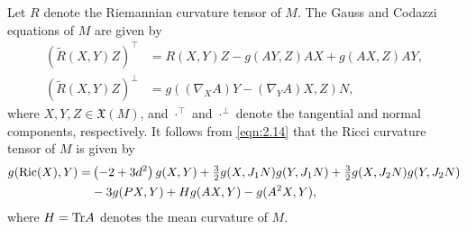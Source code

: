 \documentclass[reqno]{amsart}%
\theoremstyle{definition}
\numberwithin{equation}{section}
\begin{document}
	Let $R$ denote the Riemannian curvature tensor of $M$. The Gauss and Codazzi equations
	of $M$ are given by
	\begin{align}
		(\tilde R(X,Y)Z)^\top &=  R(X,Y)Z - g(AY,Z)AX + g(AX,Z)AY, \label{eqn:2.14} \\
		(\tilde R(X,Y)Z)^\perp &= g((\nabla_X A)Y - (\nabla_Y A)X,Z) N, \label{eqn:2.15}
	\end{align}
	where $X,Y,Z\in \mathfrak X(M)$, and $\cdot^\top$ and $\cdot^\perp$ denote the tangential and normal components, respectively. 
	It follows from \eqref{eqn:2.14} that the Ricci curvature tensor of $M$ is given by
	\begin{equation}\label{eqn:MRic}
		\begin{aligned}
			g({\rm Ric}(X),Y)=&\left(-2+3d^2\right)g(X,Y)+\tfrac{3}{2}g(X,J_1N)g(Y,J_1N)+\tfrac{3}{2}g(X,J_2N)g(Y,J_2N)\\
			&-3g(PX,Y)+Hg(AX,Y)-g(A^2X,Y),
		\end{aligned}
	\end{equation}
	where $H={\rm Tr}A$ denotes the mean curvature of $M$.
	
	
\end{document}
